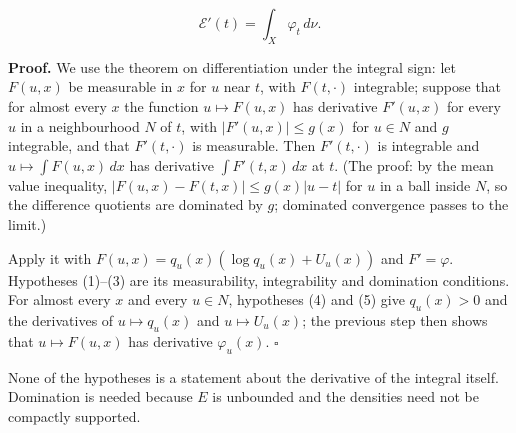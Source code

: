 \documentclass[11pt,a4paper]{report}
\begin{document}
\[\mathcal E'(t)=\int_X\varphi_t\,d\nu.\]


\textbf{Proof.} We use the theorem on differentiation under the integral sign: let \(F(u,x)\) be measurable in \(x\) for \(u\) near \(t\), with \(F(t,\cdot)\) integrable; suppose that for almost every \(x\) the function \(u\mapsto F(u,x)\) has derivative \(F'(u,x)\) for every \(u\) in a neighbourhood \(N\) of \(t\), with \(|F'(u,x)|\le g(x)\) for \(u\in N\) and \(g\) integrable, and that \(F'(t,\cdot)\) is measurable. Then \(F'(t,\cdot)\) is integrable and \(u\mapsto\int F(u,x)\,dx\) has derivative \(\int F'(t,x)\,dx\) at \(t\). (The proof: by the mean value inequality, \(|F(u,x)-F(t,x)|\le g(x)|u-t|\) for \(u\) in a ball inside \(N\), so the difference quotients are dominated by \(g\); dominated convergence passes to the limit.)




Apply it with \(F(u,x)=q_u(x)(\log q_u(x)+U_u(x))\) and \(F'=\varphi\). Hypotheses (1)–(3) are its measurability, integrability and domination conditions. For almost every \(x\) and every \(u\in N\), hypotheses (4) and (5) give \(q_u(x)>0\) and the derivatives of \(u\mapsto q_u(x)\) and \(u\mapsto U_u(x)\); the previous step then shows that \(u\mapsto F(u,x)\) has derivative \(\varphi_u(x)\). \(\square\)




None of the hypotheses is a statement about the derivative of the integral itself. Domination is needed because \(E\) is unbounded and the densities need not be compactly supported.
\end{document}

